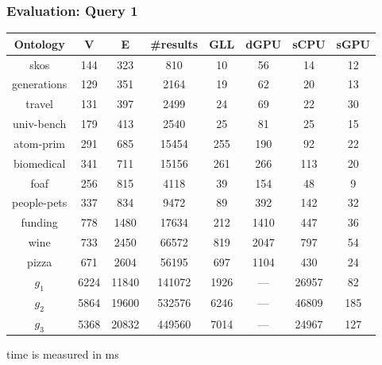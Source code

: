 \documentclass[xcolor=table]{beamer}
\begin{document}
\begin{frame}
  \transwipe[direction=90]
  \frametitle{Evaluation: Query 1}         
\begin{tabular}{  c | c | c | c | c | c | c | c }
Ontology & V & E & \#results & GLL & dGPU & sCPU & sGPU\\
\hline
skos        & 144 & 323 & 810 & 10 & 56 & 14 & 12\\
generations & 129 & 351 & 2164 & 19 & 62 & 20 & 13\\
travel      & 131 & 397 & 2499 & 24 & 69 & 22 & 30\\
univ-bench  & 179 & 413 & 2540 & 25 & 81 & 25 & 15\\
atom-prim   & 291 & 685 & 15454 & 255 & 190 & 92 & 22\\ %
biomedical  & 341 & 711 & 15156 & 261 & 266 & 113 & 20\\ %
foaf        & 256 & 815 & 4118 & 39 & 154 & 48 & 9\\
people-pets & 337 & 834 & 9472 & 89 & 392 & 142 & 32\\
funding     & 778 & 1480 & 17634 & 212 & 1410 & 447 & 36\\
wine        & 733 & 2450 & 66572 & 819 & 2047 & 797 & 54\\
pizza       & 671 & 2604 & 56195 & 697 & 1104 & 430 & 24\\
$g_{1}$     & 6224 & 11840 & 141072 & 1926 & --- & 26957 & 82\\
$g_{2}$     & 5864 & 19600 & 532576 & 6246 & --- & 46809 & 185\\
$g_{3}$     & 5368 & 20832 & 449560 & 7014 & --- & 24967 & 127\\
\end{tabular}

\begin{center} time is measured in ms \end{center}
    \end{frame}     
\end{document}
